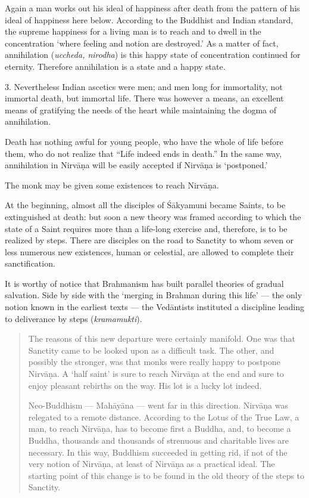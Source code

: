 \documentclass[a4paper, 11pt, oneside, english]{article}
\begin{document}
Again a man works out his ideal of happiness after death from the pattern of his ideal of happiness here below. According to the Buddhist and Indian standard, the supreme happiness for a living man is to reach and to dwell in the concentration `where feeling and notion are destroyed.' As a matter of fact, annihilation (\emph{uccheda, nirodha}) is this happy state of concentration continued for eternity. Therefore annihilation is a state and a happy state.

3. Nevertheless Indian ascetics were men; and men long for immortality, not immortal death, but immortal life. There was however a means, an excellent means of gratifying the needs of the heart while maintaining the dogma of annihilation.

Death has nothing awful for young people, who have the whole of life before them, who do not realize that ``Life indeed ends in death.'' In the same way, annihilation in Nirvāṇa will be easily accepted if Nirvāṇa is `postponed.'

The monk may be given some existences to reach Nirvāṇa.

At the beginning, almost all the disciples of Śākyamuni became Saints, to be extinguished at death: but soon a new theory was framed according to which the state of a Saint requires more than a life-long exercise and, therefore, is to be realized by steps. There are disciples on the road to Sanctity to whom seven or less numerous new existences, human or celestial, are allowed to complete their sanctification.

It is worthy of notice that Brahmanism has built parallel theories of gradual salvation. Side by side with the `merging in Brahman during this life' --- the only notion known in the earliest texts --- the Vedāntists instituted a discipline leading to deliverance by steps (\emph{kramamukti}).
\begin{quotation}
\small
The reasons of this new departure were certainly manifold. One was that Sanctity came to be looked upon as a difficult task. The other, and possibly the stronger, was that monks were really happy to postpone Nirvāṇa. A `half saint' is sure to reach Nirvāṇa at the end and sure to enjoy pleasant rebirths on the way. His lot is a lucky lot indeed.

Neo-Buddhism --- Mahāyāna --- went far in this direction. Nirvāṇa was relegated to a remote distance. According to the Lotus of the True Law, a man, to reach Nirvāṇa, has to become first a Buddha, and, to become a Buddha, thousands and thousands of strenuous and charitable lives are necessary. In this way, Buddhism succeeded in getting rid, if not of the very notion of Nirvāṇa, at least of Nirvāṇa as a practical ideal. The starting point of this change is to be found in the old theory of the steps to Sanctity.
\end{quotation}
\end{document}
